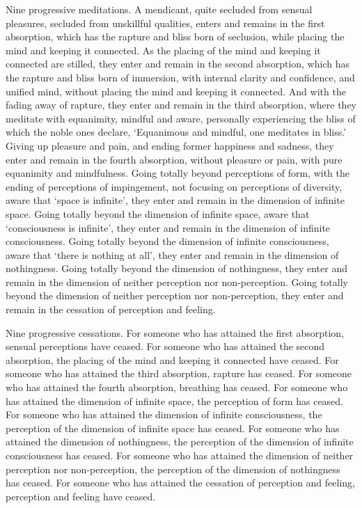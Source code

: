 \documentclass[12pt,openany]{book}%
\begin{document}
Nine progressive meditations. A mendicant, quite secluded from sensual pleasures, secluded from unskillful qualities, enters and remains in the first absorption, which has the rapture and bliss born of seclusion, while placing the mind and keeping it connected. As the placing of the mind and keeping it connected are stilled, they enter and remain in the second absorption, which has the rapture and bliss born of immersion, with internal clarity and confidence, and unified mind, without placing the mind and keeping it connected. And with the fading away of rapture, they enter and remain in the third absorption, where they meditate with equanimity, mindful and aware, personally experiencing the bliss of which the noble ones declare, ‘Equanimous and mindful, one meditates in bliss.’ Giving up pleasure and pain, and ending former happiness and sadness, they enter and remain in the fourth absorption, without pleasure or pain, with pure equanimity and mindfulness. Going totally beyond perceptions of form, with the ending of perceptions of impingement, not focusing on perceptions of diversity, aware that ‘space is infinite’, they enter and remain in the dimension of infinite space. Going totally beyond the dimension of infinite space, aware that ‘consciousness is infinite’, they enter and remain in the dimension of infinite consciousness. Going totally beyond the dimension of infinite consciousness, aware that ‘there is nothing at all’, they enter and remain in the dimension of nothingness. Going totally beyond the dimension of nothingness, they enter and remain in the dimension of neither perception nor non-perception. Going totally beyond the dimension of neither perception nor non-perception, they enter and remain in the cessation of perception and feeling. 

Nine progressive cessations. For someone who has attained the first absorption, sensual perceptions have ceased. For someone who has attained the second absorption, the placing of the mind and keeping it connected have ceased. For someone who has attained the third absorption, rapture has ceased. For someone who has attained the fourth absorption, breathing has ceased. For someone who has attained the dimension of infinite space, the perception of form has ceased. For someone who has attained the dimension of infinite consciousness, the perception of the dimension of infinite space has ceased. For someone who has attained the dimension of nothingness, the perception of the dimension of infinite consciousness has ceased. For someone who has attained the dimension of neither perception nor non-perception, the perception of the dimension of nothingness has ceased. For someone who has attained the cessation of perception and feeling, perception and feeling have ceased. 
\end{document}
